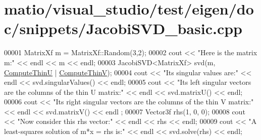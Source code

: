 \hypertarget{matio_2visual__studio_2test_2eigen_2doc_2snippets_2_jacobi_s_v_d__basic_8cpp_source}{}\section{matio/visual\+\_\+studio/test/eigen/doc/snippets/\+Jacobi\+S\+V\+D\+\_\+basic.cpp}
\label{matio_2visual__studio_2test_2eigen_2doc_2snippets_2_jacobi_s_v_d__basic_8cpp_source}

\begin{DoxyCode}
00001 MatrixXf m = MatrixXf::Random(3,2);
00002 cout << \textcolor{stringliteral}{"Here is the matrix m:"} << endl << m << endl;
00003 JacobiSVD<MatrixXf> svd(m, \hyperlink{group__enums_ggae3e239fb70022eb8747994cf5d68b4a9af8c742a1aa87773e165eae406c9ccaf8}{ComputeThinU} | \hyperlink{group__enums_ggae3e239fb70022eb8747994cf5d68b4a9a1055e53fa95c8ae04a07ebb72cfafd95}{ComputeThinV});
00004 cout << \textcolor{stringliteral}{"Its singular values are:"} << endl << svd.singularValues() << endl;
00005 cout << \textcolor{stringliteral}{"Its left singular vectors are the columns of the thin U matrix:"} << endl << svd.matrixU() << endl;
00006 cout << \textcolor{stringliteral}{"Its right singular vectors are the columns of the thin V matrix:"} << endl << svd.matrixV() << endl
      ;
00007 Vector3f rhs(1, 0, 0);
00008 cout << \textcolor{stringliteral}{"Now consider this rhs vector:"} << endl << rhs << endl;
00009 cout << \textcolor{stringliteral}{"A least-squares solution of m*x = rhs is:"} << endl << svd.solve(rhs) << endl;
\end{DoxyCode}
